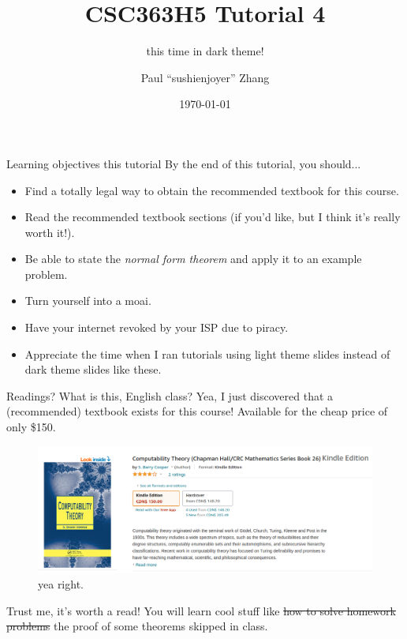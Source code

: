 \documentclass{beamer}
\title{CSC363H5 Tutorial 4}
\subtitle{this time in dark theme!}
\date{\today}
\author{Paul ``sushi{\textunderscore}enjoyer'' Zhang}
\institute{University of Chungi}
\begin{document}
\maketitle

\begin{frame}{Learning objectives this tutorial}
By the end of this tutorial, you should...
\begin{itemize}
\item Find a totally legal way to obtain the recommended textbook for this course.
\item Read the recommended textbook sections (if you'd like, but I think it's really worth it!).
\item Be able to state the \textit{normal form theorem} and apply it to an example problem.
\item Turn yourself into a moai. \emojimoyai \emojimoyai \emojimoyai
\item Have your internet revoked by your ISP due to piracy.
\item Appreciate the time when I ran tutorials using light theme slides instead of dark theme slides like these.
\end{itemize}
\end{frame}

\begin{frame}{Readings? What is this, English class?}
Yea, I just discovered that a (recommended) textbook exists for this course! Available for the cheap price of only \$150.
\begin{figure}[placement]
\centering
\includegraphics[scale=0.3]{img/book.png}
yea right.
\end{figure}
Trust me, it's worth a read! You will learn cool stuff like \sout{how to solve homework problems} the proof of some theorems skipped in class.

\end{frame}
\end{document}
